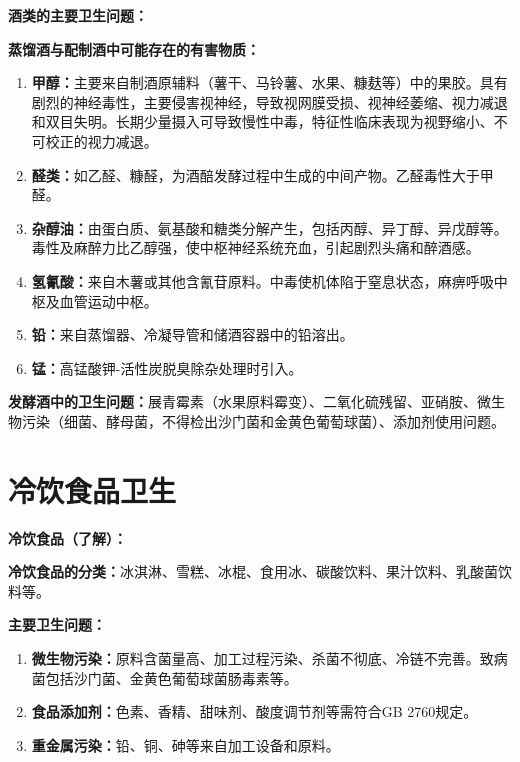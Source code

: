 \begin{keybox}
\textbf{酒类的主要卫生问题：}

\textbf{蒸馏酒与配制酒中可能存在的有害物质：}
\begin{enumerate}[leftmargin=*]
    \item \textbf{甲醇：}主要来自制酒原辅料（薯干、马铃薯、水果、糠麸等）中的果胶。具有剧烈的神经毒性，主要侵害视神经，导致视网膜受损、视神经萎缩、视力减退和双目失明。长期少量摄入可导致慢性中毒，特征性临床表现为视野缩小、不可校正的视力减退。
    \item \textbf{醛类：}如乙醛、糠醛，为酒醅发酵过程中生成的中间产物。乙醛毒性大于甲醛。
    \item \textbf{杂醇油：}由蛋白质、氨基酸和糖类分解产生，包括丙醇、异丁醇、异戊醇等。毒性及麻醉力比乙醇强，使中枢神经系统充血，引起剧烈头痛和醉酒感。
    \item \textbf{氢氰酸：}来自木薯或其他含氰苷原料。中毒使机体陷于窒息状态，麻痹呼吸中枢及血管运动中枢。
    \item \textbf{铅：}来自蒸馏器、冷凝导管和储酒容器中的铅溶出。
    \item \textbf{锰：}高锰酸钾-活性炭脱臭除杂处理时引入。
\end{enumerate}

\textbf{发酵酒中的卫生问题：}展青霉素（水果原料霉变）、二氧化硫残留、亚硝胺、微生物污染（细菌、酵母菌，不得检出沙门菌和金黄色葡萄球菌）、添加剂使用问题。
\end{keybox}

\section{冷饮食品卫生}

\begin{tipbox}
\textbf{冷饮食品（了解）：}

\textbf{冷饮食品的分类：}冰淇淋、雪糕、冰棍、食用冰、碳酸饮料、果汁饮料、乳酸菌饮料等。

\textbf{主要卫生问题：}
\begin{enumerate}[leftmargin=*]
    \item \textbf{微生物污染：}原料含菌量高、加工过程污染、杀菌不彻底、冷链不完善。致病菌包括沙门菌、金黄色葡萄球菌肠毒素等。
    \item \textbf{食品添加剂：}色素、香精、甜味剂、酸度调节剂等需符合GB 2760规定。
    \item \textbf{重金属污染：}铅、铜、砷等来自加工设备和原料。
\end{enumerate}
\end{tipbox}

